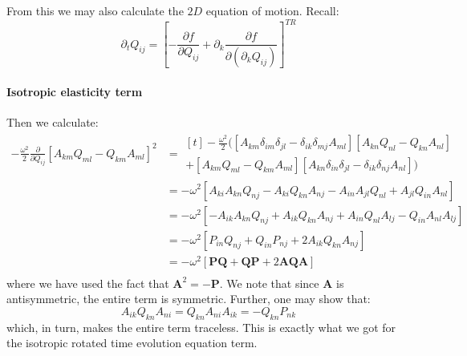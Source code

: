 \documentclass[reqno]{article}
\newcommand{\Q}{\mathbf{Q}}
\newcommand{\bP}{\mathbf{P}}
\newcommand{\A}{\mathbf{A}}
\begin{document}
From this we may also calculate the $2D$ equation of motion.
Recall:
\begin{equation}
    \partial_t Q_{ij}
    =
    \left[
        -\frac{\partial f}{\partial Q_{ij}}
        + \partial_k \frac{\partial f}{\partial (\partial_k Q_{ij})}
    \right]^{TR}
\end{equation}

\paragraph{Isotropic elasticity term}

Then we calculate:
\begin{equation}
\begin{split}
    -\frac{\omega^2}{2} \frac{\partial}{\partial Q_{ij}} \left[
        A_{km} Q_{ml} - Q_{km} A_{ml}
    \right]^2
    &=
    \begin{multlined}[t]
    -\frac{\omega^2}{2} 
    \Biggl(
        \left[
            A_{km} \delta_{im} \delta_{jl} - \delta_{ik} \delta_{mj} A_{ml}
        \right]
        \left[
            A_{kn} Q_{nl} - Q_{kn} A_{nl}
        \right] \\
        +
        \left[
            A_{km} Q_{ml} - Q_{km} A_{ml}
        \right]
        \left[
            A_{kn} \delta_{in} \delta_{jl} - \delta_{ik} \delta_{nj} A_{nl}
        \right]
    \Biggr)
    \end{multlined} \\
    &=
    -\omega^2 \left[
        A_{ki} A_{kn} Q_{nj}
        - A_{ki} Q_{kn} A_{nj}
        - A_{in} A_{jl} Q_{nl}
        + A_{jl} Q_{in} A_{nl}
    \right] \\
    &=
    -\omega^2 \left[
        -A_{ik} A_{kn} Q_{nj}
        + A_{ik} Q_{kn} A_{nj}
        + A_{in} Q_{nl} A_{lj}
        - Q_{in} A_{nl} A_{lj}
    \right] \\
    &=
    -\omega^2 \left[
        P_{in} Q_{nj}
        + Q_{in} P_{nj}
        + 2 A_{ik} Q_{kn} A_{nj}
    \right] \\
    &=
    -\omega^2 \left[
        \bP \Q
        + \Q \bP
        + 2 \A \Q \A
    \right] \\
\end{split}
\end{equation}
where we have used the fact that $\A^2 = -\bP$. 
We note that since $\A$ is antisymmetric, the entire term is symmetric. 
Further, one may show that:
\begin{equation}
    A_{ik} Q_{kn} A_{ni}
    =
    Q_{kn} A_{ni} A_{ik}
    = 
    -Q_{kn} P_{nk}
\end{equation}
which, in turn, makes the entire term traceless.
This is exactly what we got for the isotropic rotated time evolution equation term.
\end{document}
